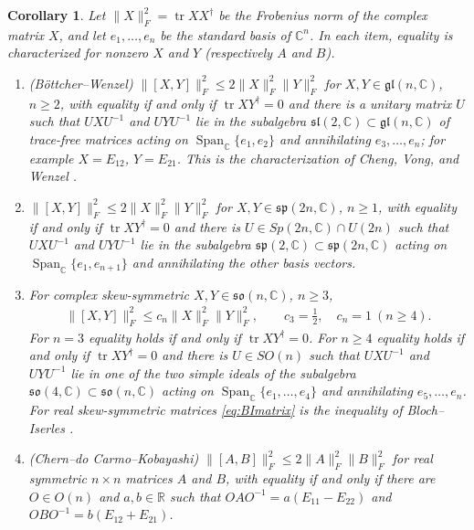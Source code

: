 \documentclass [leqno, 10pt]{amsart}
\newtheorem{corollary}[theorem]{Corollary}%
\theoremstyle{definition}
\numberwithin{equation}{section}
\newcommand{\so}{\mathfrak{so}}
\renewcommand{\sp}{\mathfrak{sp}}
\newcommand{\spn}{\operatorname{Span}}
\newcommand{\gl}{\mathfrak{gl}}
\newcommand{\sll}{\mathfrak{sl}}
\newcommand{\rea}{\mathbb R}
\newcommand{\com}{\mathbb C}
\newcommand{\tr}{\operatorname{tr}}
\newcommand{\fnorm}[1]{\lVert #1\rVert_{F}}
\begin{document}
\begin{corollary}\label{cor:matrix}
Let $\fnorm{X}^{2} = \tr XX^{\dagger}$ be the Frobenius norm of the complex matrix $X$, and let $e_{1}, \dots, e_{n}$ be the standard basis of $\com^{n}$. In each item, equality is characterized for nonzero $X$ and $Y$ (respectively $A$ and $B$).
\begin{enumerate}[label=(\arabic*), ref=(\arabic*)]
\item\label{mat1} (Böttcher--Wenzel) $\fnorm{[X, Y]}^{2} \leq 2\fnorm{X}^{2}\fnorm{Y}^{2}$ for $X, Y \in \gl(n, \com)$, $n \geq 2$, with equality if and only if $\tr XY^{\dagger} = 0$ and there is a unitary matrix $U$ such that $UXU^{-1}$ and $UYU^{-1}$ lie in the subalgebra $\sll(2, \com) \subset \gl(n, \com)$ of trace-free matrices acting on $\spn_{\com}\{e_{1}, e_{2}\}$ and annihilating $e_{3}, \dots, e_{n}$; for example $X = E_{12}$, $Y = E_{21}$. This is the characterization of Cheng, Vong, and Wenzel \cite[Theorems~3.1 and 3.2]{Cheng-Vong-Wenzel}.
\item\label{mat2} $\fnorm{[X, Y]}^{2} \leq 2\fnorm{X}^{2}\fnorm{Y}^{2}$ for $X, Y \in \sp(2n, \com)$, $n \geq 1$, with equality if and only if $\tr XY^{\dagger} = 0$ and there is $U \in Sp(2n, \com) \cap U(2n)$ such that $UXU^{-1}$ and $UYU^{-1}$ lie in the subalgebra $\sp(2, \com) \subset \sp(2n, \com)$ acting on $\spn_{\com}\{e_{1}, e_{n+1}\}$ and annihilating the other basis vectors.
\item\label{mat3} For complex skew-symmetric $X, Y \in \so(n, \com)$, $n \geq 3$,
\begin{align}\label{eq:BImatrix}
\fnorm{[X, Y]}^{2} \leq c_{n}\fnorm{X}^{2}\fnorm{Y}^{2}, \qquad c_{3} = \tfrac{1}{2}, \quad c_{n} = 1 \ (n \geq 4).
\end{align}
For $n = 3$ equality holds if and only if $\tr XY^{\dagger} = 0$. For $n \geq 4$ equality holds if and only if $\tr XY^{\dagger} = 0$ and there is $U \in SO(n)$ such that $UXU^{-1}$ and $UYU^{-1}$ lie in one of the two simple ideals of the subalgebra $\so(4, \com) \subset \so(n, \com)$ acting on $\spn_{\com}\{e_{1}, \dots, e_{4}\}$ and annihilating $e_{5}, \dots, e_{n}$. For real skew-symmetric matrices \eqref{eq:BImatrix} is the inequality of Bloch--Iserles \cite{Bloch-Iserles}.
\item\label{mat4} (Chern--do Carmo--Kobayashi) $\fnorm{[A, B]}^{2} \leq 2\fnorm{A}^{2}\fnorm{B}^{2}$ for real symmetric $n \times n$ matrices $A$ and $B$, with equality if and only if there are $O \in O(n)$ and $a, b \in \rea$ such that $OAO^{-1} = a(E_{11} - E_{22})$ and $OBO^{-1} = b(E_{12} + E_{21})$.
\end{enumerate}
\end{corollary}
\end{document}
